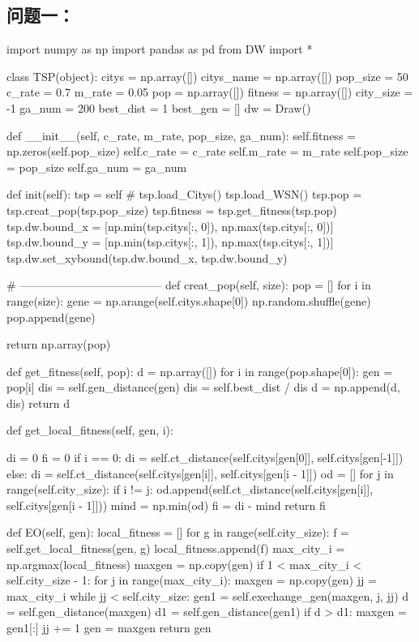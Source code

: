 \documentclass{ctexart}
\begin{document}
    \subsection*{问题一：}
    \begin{python}
import numpy as np
import pandas as pd
from DW import *


class TSP(object):
    citys = np.array([])
    citys_name = np.array([])
    pop_size = 50
    c_rate = 0.7
    m_rate = 0.05
    pop = np.array([])
    fitness = np.array([])
    city_size = -1
    ga_num = 200
    best_dist = 1
    best_gen = []
    dw = Draw()

    def __init__(self, c_rate, m_rate, pop_size, ga_num):
        self.fitness = np.zeros(self.pop_size)
        self.c_rate = c_rate
        self.m_rate = m_rate
        self.pop_size = pop_size
        self.ga_num = ga_num

    def init(self):
        tsp = self
        # tsp.load_Citys()
        tsp.load_WSN()
        tsp.pop = tsp.creat_pop(tsp.pop_size)
        tsp.fitness = tsp.get_fitness(tsp.pop)
        tsp.dw.bound_x = [np.min(tsp.citys[:, 0]), np.max(tsp.citys[:, 0])]
        tsp.dw.bound_y = [np.min(tsp.citys[:, 1]), np.max(tsp.citys[:, 1])]
        tsp.dw.set_xybound(tsp.dw.bound_x, tsp.dw.bound_y)

    # --------------------------------------
    def creat_pop(self, size):
        pop = []
        for i in range(size):
            gene = np.arange(self.citys.shape[0])
            np.random.shuffle(gene)
            pop.append(gene)

        return np.array(pop)

    def get_fitness(self, pop):
        d = np.array([])
        for i in range(pop.shape[0]):
            gen = pop[i]  
            dis = self.gen_distance(gen)
            dis = self.best_dist / dis
            d = np.append(d, dis)
        return d

    def get_local_fitness(self, gen, i):
 
        di = 0
        fi = 0
        if i == 0:
            di = self.ct_distance(self.citys[gen[0]], self.citys[gen[-1]])
        else:
            di = self.ct_distance(self.citys[gen[i]], self.citys[gen[i - 1]])
        od = []
        for j in range(self.city_size):
            if i != j:
                od.append(self.ct_distance(self.citys[gen[i]], self.citys[gen[i - 1]]))
        mind = np.min(od)
        fi = di - mind
        return fi

    def EO(self, gen):
        local_fitness = []
        for g in range(self.city_size):
            f = self.get_local_fitness(gen, g)
            local_fitness.append(f)
        max_city_i = np.argmax(local_fitness)
        maxgen = np.copy(gen)
        if 1 < max_city_i < self.city_size - 1:
            for j in range(max_city_i):
                maxgen = np.copy(gen)
                jj = max_city_i
                while jj < self.city_size:
                    gen1 = self.exechange_gen(maxgen, j, jj)
                    d = self.gen_distance(maxgen)
                    d1 = self.gen_distance(gen1)
                    if d > d1:
                        maxgen = gen1[:]
                    jj += 1
        gen = maxgen
        return gen


\end{python}
\end{document}
